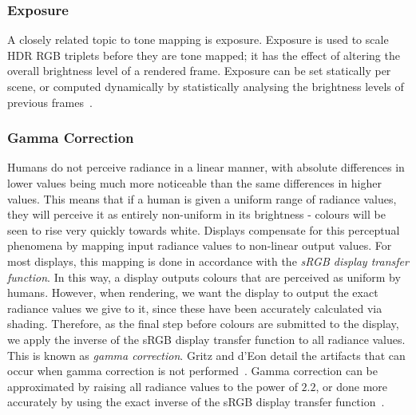\subsubsection{Exposure}

A closely related topic to tone mapping is exposure. Exposure is used to scale HDR RGB triplets before they are tone mapped; it has the effect of altering the overall brightness level of a rendered frame. Exposure can be set statically per scene, or computed dynamically by statistically analysing the brightness levels of previous frames~\cite{RTR4}.

\subsubsection{Gamma Correction}

Humans do not perceive radiance in a linear manner, with absolute differences in lower values being much more noticeable than the same differences in higher values. This means that if a human is given a uniform range of radiance values, they will perceive it as entirely non-uniform in its brightness - colours will be seen to rise very quickly towards white. Displays compensate for this perceptual phenomena by mapping input radiance values to non-linear output values. For most displays, this mapping is done in accordance with the \textit{sRGB display transfer function}. In this way, a display outputs colours that are perceived as uniform by humans. However, when rendering, we want the display to output the exact radiance values we give to it, since these have been accurately calculated via shading. Therefore, as the final step before colours are submitted to the display, we apply the inverse of the sRGB display transfer function to all radiance values. This is known as \textit{gamma correction}. Gritz and d'Eon detail the artifacts that can occur when gamma correction is not performed~\cite{GPUGemsChapter24}. Gamma correction can be approximated by raising all radiance values to the power of \begin{math}2.2\end{math}, or done more accurately by using the exact inverse of the sRGB display transfer function~\cite{MovingFrostbitetoPBR}.
